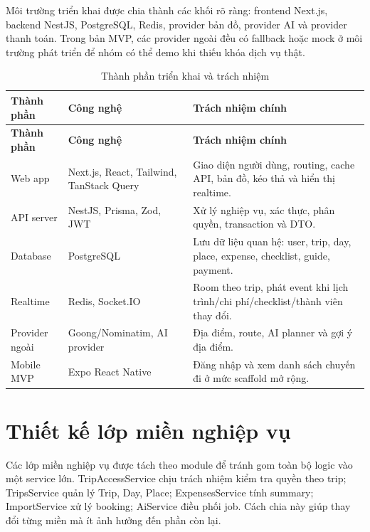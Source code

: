 \documentclass[a4paper]{report}
\begin{document}
Môi trường triển khai được chia thành các khối rõ ràng: frontend Next.js, backend NestJS, PostgreSQL, Redis, provider bản đồ, provider AI và provider thanh toán. Trong bản MVP, các provider ngoài đều có fallback hoặc mock ở môi trường phát triển để nhóm có thể demo khi thiếu khóa dịch vụ thật.

\begin{longtable}{|P{3.7cm}|P{5.2cm}|P{6.5cm}|}
\caption{Thành phần triển khai và trách nhiệm}\\
\hline
\textbf{Thành phần} & \textbf{Công nghệ} & \textbf{Trách nhiệm chính}\\
\hline
\endfirsthead
\hline
\textbf{Thành phần} & \textbf{Công nghệ} & \textbf{Trách nhiệm chính}\\
\hline
\endhead
Web app & Next.js, React, Tailwind, TanStack Query & Giao diện người dùng, routing, cache API, bản đồ, kéo thả và hiển thị realtime.\\
\hline
API server & NestJS, Prisma, Zod, JWT & Xử lý nghiệp vụ, xác thực, phân quyền, transaction và DTO.\\
\hline
Database & PostgreSQL & Lưu dữ liệu quan hệ: user, trip, day, place, expense, checklist, guide, payment.\\
\hline
Realtime & Redis, Socket.IO & Room theo trip, phát event khi lịch trình/chi phí/checklist/thành viên thay đổi.\\
\hline
Provider ngoài & Goong/Nominatim, AI provider & Địa điểm, route, AI planner và gợi ý địa điểm.\\
\hline
Mobile MVP & Expo React Native & Đăng nhập và xem danh sách chuyến đi ở mức scaffold mở rộng.\\
\hline
\end{longtable}

\section{Thiết kế lớp miền nghiệp vụ}

Các lớp miền nghiệp vụ được tách theo module để tránh gom toàn bộ logic vào một service lớn. TripAccessService chịu trách nhiệm kiểm tra quyền theo trip; TripsService quản lý Trip, Day, Place; ExpensesService tính summary; ImportService xử lý booking; AiService điều phối job. Cách chia này giúp thay đổi từng miền mà ít ảnh hưởng đến phần còn lại.
\end{document}
